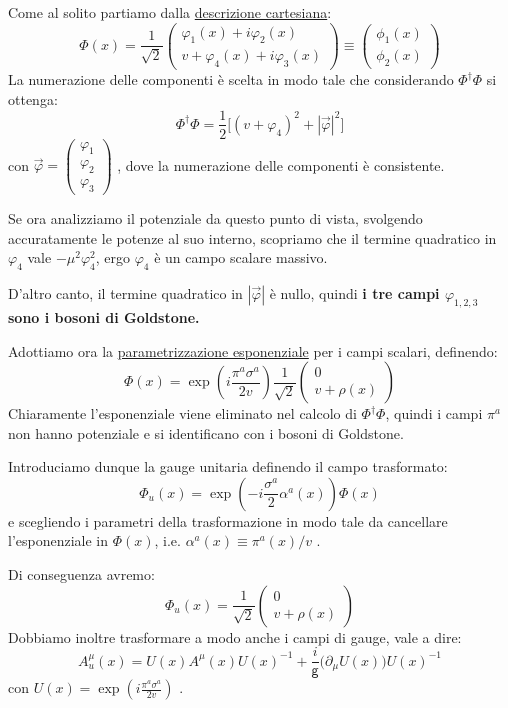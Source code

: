 \documentclass[../main.tex]{subfiles}
\begin{document}
Come al solito partiamo dalla \underline{descrizione cartesiana}:
\[
\Phi(x) = \frac{1}{\sqrt{2}}\begin{pmatrix} \varphi_1(x) + i\varphi_2(x) \\ v +\varphi_4(x) +i\varphi_3(x)\end{pmatrix} \equiv \begin{pmatrix} \phi_1(x)  \\ \phi_2(x)\end{pmatrix}
\]
La numerazione delle componenti è scelta in modo tale che considerando $\Phi^\dagger\Phi$ si ottenga:
\[
\Phi^\dagger\Phi = \frac{1}{2}\big[(v +\varphi_4)^2 + |\Vec{\varphi}|^2\big]
\]
con $\Vec{\varphi} = \begin{pmatrix} \varphi_1 \\ \varphi_2 \\ \varphi_3\end{pmatrix}$ , dove la numerazione delle componenti è consistente.

Se ora analizziamo il potenziale da questo punto di vista, svolgendo accuratamente le potenze al suo interno, scopriamo che il termine quadratico in $\varphi_4$ vale $-\mu^2\varphi^2_4$, ergo $\varphi_4$ è un campo scalare massivo.

D'altro canto, il termine quadratico in $|\Vec\varphi|$ è nullo, quindi \textbf{i tre campi $\varphi_{1,2,3}$ sono i bosoni di Goldstone.}

Adottiamo ora la \underline{parametrizzazione esponenziale} per i campi scalari, definendo:
\[
\boxed{
\Phi(x) =  \exp(i\frac{\pi^a\sigma^a}{2v}) \frac{1}{\sqrt{2}}\begin{pmatrix}0\\v+\rho(x)\end{pmatrix}
}
\]
Chiaramente l'esponenziale viene eliminato nel calcolo  di $\Phi^\dagger\Phi$, quindi i campi $\pi^a$ non hanno potenziale e si identificano con i bosoni di Goldstone.

Introduciamo dunque la gauge unitaria definendo il campo trasformato:
\[
\Phi_u(x) = \exp(-i\frac{\sigma^a}{2}\alpha^a(x))\Phi(x)
\]
e scegliendo i parametri della trasformazione in modo tale da cancellare l'esponenziale in $\Phi(x)$, i.e. $\boxed{\alpha^a(x)\equiv \pi^a(x)/v}$ .

Di conseguenza avremo:
\[
\boxed{
\Phi_u(x) = \frac{1}{\sqrt{2}}\begin{pmatrix}0\\v+\rho(x)\end{pmatrix}
}
\]
Dobbiamo inoltre trasformare a modo anche i campi di gauge, vale a dire:
\[
\boxed{
A^\mu_u(x) = U(x)A^\mu(x)U(x)^{-1} +\frac{i}{\mathsf g}\big(\partial_\mu U(x)\big)U(x)^{-1}
}
\]
con $U(x) = \exp(i\frac{\pi^a\sigma^a}{2v})$ .
\end{document}

